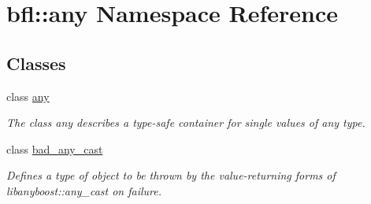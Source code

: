 \hypertarget{namespacebfl_1_1any}{}\section{bfl\+:\+:any Namespace Reference}
\label{namespacebfl_1_1any}
\subsection*{Classes}
\begin{DoxyCompactItemize}
\item 
class \mbox{\hyperlink{classbfl_1_1any_1_1any}{any}}
\begin{DoxyCompactList}\small\item\em The class any describes a type-\/safe container for single values of any type. \end{DoxyCompactList}\item 
class \mbox{\hyperlink{classbfl_1_1any_1_1bad__any__cast}{bad\+\_\+any\+\_\+cast}}
\begin{DoxyCompactList}\small\item\em Defines a type of object to be thrown by the value-\/returning forms of libanyboost\+::any\+\_\+cast on failure. \end{DoxyCompactList}\end{DoxyCompactItemize}
